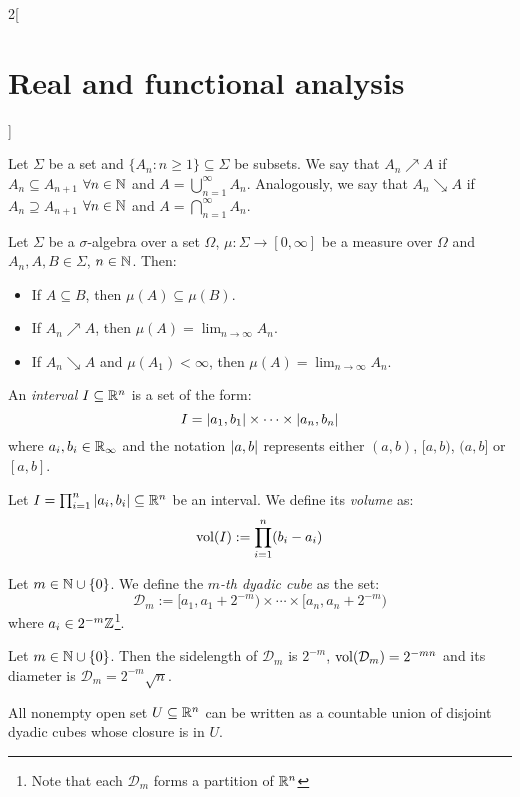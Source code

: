 \documentclass[../../../main_math.tex]{subfiles}
\begin{document}
\begin{multicols}{2}[\section{Real and functional analysis}]
\begin{definition}[Measure]
  \end{definition}
  \begin{definition}
    Let $\Sigma$ be a set and $\{A_n:n\geq1\}\subseteq\Sigma$ be subsets. We say that $A_n\nearrow A$ if $A_n\subseteq A_{n+1}$ $\forall n\in\mathbb{N}$ and $A=\bigcup_{n=1}^\infty A_n$. Analogously, we say that $A_n\searrow A$ if $A_n\supseteq A_{n+1}$ $\forall n\in\mathbb{N}$ and $A=\bigcap_{n=1}^\infty A_n$.
  \end{definition}
  \begin{proposition}
    Let $\Sigma$ be a $\sigma$-algebra over a set $\Omega$, $\mu:\Sigma\longrightarrow[0,\infty]$ be a measure over $\Omega$ and $A_n,A,B\in\Sigma$, $n\in\mathbb{N}$. Then:
    \begin{itemize}
      \item If $A\subseteq B$, then $\mu(A)\subseteq\mu(B)$.
      \item If $A_n\nearrow A$, then $\displaystyle\mu(A)=\lim_{n\to\infty} A_n$.
      \item If $A_n\searrow A$ and $\mu(A_1)<\infty$, then $\displaystyle\mu(A)=\lim_{n\to\infty} A_n$.
    \end{itemize}
  \end{proposition}
  \begin{definition}
    An \emph{interval} $I\subseteq\mathbb{R}^n$ is a set of the form:
    $$I=\abs{a_1,b_1}\times\cdots\times\abs{a_n,b_n}$$
    where $a_i,b_i\in\mathbb{R}_\infty$ and the notation $\abs{a,b}$ represents either $(a,b)$, $[a,b)$, $(a,b]$ or $[a,b]$.
  \end{definition}
  \begin{definition}
    Let $I=\prod_{i=1}^n\abs{a_i,b_i}\subseteq\mathbb{R}^n$ be an interval. We define its \emph{volume} as:
    $$\operatorname{vol}(I):=\prod_{i=1}^n(b_i-a_i)$$
  \end{definition}
  \begin{definition}
    Let $m\in\mathbb{N}\cup\{0\}$. We define the \emph{$m$-th dyadic cube} as the set: $$\mathcal{D}_m:=[a_1,a_1+2^{-m})\times\cdots\times [a_n,a_n+2^{-m})$$
    where $a_i\in 2^{-m}\mathbb{Z}$\footnote{Note that each $\mathcal{D}_m$ forms a partition of $\mathbb{R}^n$}.
  \end{definition}
  \begin{lemma}
    Let $m\in\mathbb{N}\cup\{0\}$. Then the sidelength of $\mathcal{D}_m$ is $2^{-m}$, $\operatorname{vol}(\mathcal{D}_m)= 2^{-mn}$ and its diameter is $\mathcal{D}_m= 2^{-m}\sqrt{n}$.
  \end{lemma}
  \begin{proposition}
    All nonempty open set $U\subseteq\mathbb{R}^n$ can be written as a countable union of disjoint dyadic cubes whose closure is in $U$.

\end{proposition}
\end{multicols}
\end{document}
